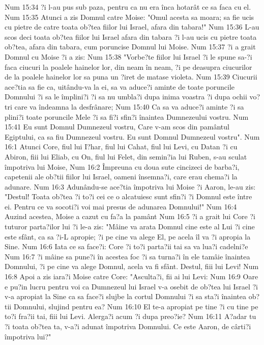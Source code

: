 Num 15:34  ?i l-au pus sub paza, pentru ca nu era înca hotarât ce sa faca cu el.
Num 15:35  Atunci a zis Domnul catre Moise: "Omul acesta sa moara; sa fie ucis cu pietre de catre toata ob?tea fiilor lui Israel, afara din tabara!"
Num 15:36  L-au scos deci toata ob?tea fiilor lui Israel afara din tabara ?i l-au ucis cu pietre toata ob?tea, afara din tabara, cum poruncise Domnul lui Moise.
Num 15:37  ?i a grait Domnul cu Moise ?i a zis:
Num 15:38  "Vorbe?te fiilor lui Israel ?i le spune sa-?i faca ciucuri la poalele hainelor lor, din neam în neam, ?i pe deasupra ciucurilor de la poalele hainelor lor sa puna un ?iret de matase violeta.
Num 15:39  Ciucurii ace?tia sa fie ca, uitându-va la ei, sa va aduce?i aminte de toate poruncile Domnului ?i sa le împlini?i ?i sa nu umbla?i dupa inima voastra ?i dupa ochii vo?tri care va îndeamna la desfrânare;
Num 15:40  Ca sa va aduce?i aminte ?i sa plini?i toate poruncile Mele ?i sa fi?i sfin?i înaintea Dumnezeului vostru.
Num 15:41  Eu sunt Domnul Dumnezeul vostru, Care v-am scos din pamântul Egiptului, ca sa fiu Dumnezeul vostru. Eu sunt Domnul Dumnezeul vostru".
Num 16:1  Atunci Core, fiul lui I?har, fiul lui Cahat, fiul lui Levi, cu Datan ?i cu Abiron, fiii lui Eliab, cu On, fiul lui Felet, din semin?ia lui Ruben, s-au sculat împotriva lui Moise,
Num 16:2  Împreuna cu doua sute cincizeci de barba?i, capetenii ale ob?tii fiilor lui Israel, oameni însemna?i, care erau chema?i la adunare.
Num 16:3  Adunându-se ace?tia împotriva lui Moise ?i Aaron, le-au zis: "Destul! Toata ob?tea ?i to?i cei ce o alcatuiesc sunt sfin?i ?i Domnul este între ei. Pentru ce va socoti?i voi mai presus de adunarea Domnului!"
Num 16:4  Auzind acestea, Moise a cazut cu fa?a la pamânt
Num 16:5  ?i a grait lui Core ?i tuturor parta?ilor lui ?i le-a zis: "Mâine va arata Domnul cine este al Lui ?i cine este sfânt, ca sa ?i-L apropie; ?i pe cine va alege El, pe acela îl va ?i apropia la Sine.
Num 16:6  Iata ce sa face?i: Core ?i to?i parta?ii tai sa va lua?i cadelni?e
Num 16:7  ?i mâine sa pune?i în acestea foc ?i sa turna?i în ele tamâie înaintea Domnului, ?i pe cine va alege Domnul, acela va fi sfânt. Destul, fiii lui Levi!
Num 16:8  Apoi a zis iara?i Moise catre Core: "Asculta?i, fii ai lui Levi:
Num 16:9  Oare e pu?in lucru pentru voi ca Dumnezeul lui Israel v-a osebit de ob?tea lui Israel ?i v-a apropiat la Sine ca sa face?i slujbe la cortul Domnului ?i sa sta?i înaintea ob?tii Domnului, slujind pentru ea?
Num 16:10  El te-a apropiat pe tine ?i cu tine pe to?i fra?ii tai, fiii lui Levi. Alerga?i acum ?i dupa preo?ie?
Num 16:11  A?adar tu ?i toata ob?tea ta, v-a?i adunat împotriva Domnului. Ce este Aaron, de cârti?i împotriva lui?"
